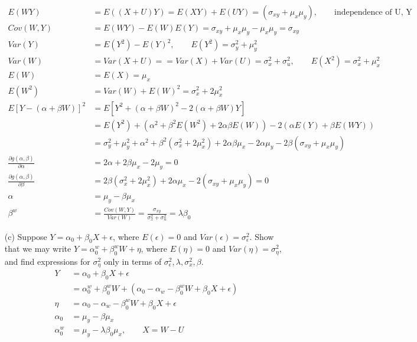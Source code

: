 \documentclass{homework}
\begin{document}
\begin{itemize}
\begin{align*}
    E(WY) &= E((X+U)Y) = E(XY) + E(UY) = (\sigma_{xy} + \mu_x\mu_y), \qquad \text{independence of U, Y}\\
    Cov(W,Y) &= E(WY) - E(W)E(Y) = \sigma_{xy} + \mu_x\mu_y - \mu_x\mu_y =\sigma_{xy} \\
    Var(Y) &= E(Y^2) - E(Y)^2, \qquad E(Y^2) = \sigma_y^2 + \mu_y^2\\
    Var(W) &= Var(X+U) = = Var(X) + Var(U) = \sigma_x^2 + \sigma_u^2, \qquad E(X^2) = \sigma_x^2 + \mu_x^2\\
    E(W) &= E(X) = \mu_x\\
    E(W^2) &= Var(W) + E(W)^2 = \sigma_x^2 + 2\mu_x^2 \\
     E[Y-(\alpha + \beta W)]^2 &= E[Y^2 + (\alpha + \beta W)^2 -2(\alpha + \beta W)Y ]\\
     &= E(Y^2) + (\alpha^2 + \beta^2 E(W^2) + 2\alpha\beta E(W)) - 2(\alpha E(Y) + \beta E(WY))\\
     &= \sigma_y^2+\mu_y^2 + \alpha^2 + \beta^2 (\sigma_x^2 + 2\mu_x^2) + 2\alpha\beta \mu_x -2\alpha \mu_y -2 \beta (\sigma_{xy}+ \mu_x\mu_y)\\
     \frac{\partial g(\alpha,\beta)}{\partial \alpha} &= 2\alpha + 2\beta \mu_x - 2\mu_y = 0\\
     \frac{\partial g(\alpha,\beta)}{\partial \beta} &=2\beta (\sigma_x^2 + 2\mu_x^2) + 2\alpha \mu_x -2(\sigma_{xy}+\mu_x\mu_y) = 0\\
     \alpha &= \mu_y - \beta \mu_x\\
     \beta^w &= \frac{Cov(W,Y)}{Var(W)} = \frac{\sigma_{xy}}{\sigma_x^2 + \sigma_u^2} = \lambda \beta_0
    \end{align*} 
    \item[(c)] Suppose $Y=\alpha_0 + \beta_0 X + \epsilon$, where $E(\epsilon) = 0$ and $Var(\epsilon) = \sigma_\epsilon^2$. Show that we may write $Y=\alpha_0^w + \beta_0^w W + \eta$, where $E(\eta) = 0$ and $Var(\eta) = \sigma_\eta^2$, and find expressions for $\sigma_\eta^2$ only in terms of $\sigma_\epsilon^2, \lambda, \sigma_x^2, \beta$.\\
    \begin{align*}
    Y &=\alpha_0 + \beta_0 X + \epsilon\\
    &= \alpha_0^w + \beta_0^w W + (\alpha_0 - \alpha_w - \beta_0^w W + \beta_0 X + \epsilon)\\
    \eta &= \alpha_0 - \alpha_w - \beta_0^w W + \beta_0 X + \epsilon\\
    \alpha_0 &= \mu_y - \beta \mu_x\\
    \alpha_0^w &= \mu_y - \lambda \beta_0\mu_x, \qquad X= W-U\\

\end{align*}
\end{itemize}
\end{document}
